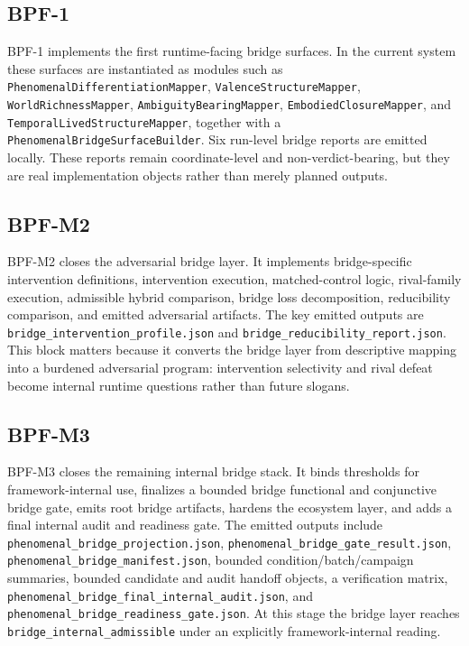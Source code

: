 \documentclass[11pt,a4paper]{article}
\theoremstyle{definition}
\begin{document}
\subsection{BPF-1}
BPF-1 implements the first runtime-facing bridge surfaces. In the current system these surfaces are instantiated as modules such as \texttt{PhenomenalDifferentiationMapper}, \texttt{ValenceStructureMapper}, \texttt{WorldRichnessMapper}, \texttt{AmbiguityBearingMapper}, \texttt{EmbodiedClosureMapper}, and \texttt{TemporalLivedStructureMapper}, together with a \texttt{PhenomenalBridgeSurfaceBuilder}. Six run-level bridge reports are emitted locally. These reports remain coordinate-level and non-verdict-bearing, but they are real implementation objects rather than merely planned outputs.

\subsection{BPF-M2}
BPF-M2 closes the adversarial bridge layer. It implements bridge-specific intervention definitions, intervention execution, matched-control logic, rival-family execution, admissible hybrid comparison, bridge loss decomposition, reducibility comparison, and emitted adversarial artifacts. The key emitted outputs are \texttt{bridge\_intervention\_profile.json} and \texttt{bridge\_reducibility\_report.json}. This block matters because it converts the bridge layer from descriptive mapping into a burdened adversarial program: intervention selectivity and rival defeat become internal runtime questions rather than future slogans.

\subsection{BPF-M3}
BPF-M3 closes the remaining internal bridge stack. It binds thresholds for framework-internal use, finalizes a bounded bridge functional and conjunctive bridge gate, emits root bridge artifacts, hardens the ecosystem layer, and adds a final internal audit and readiness gate. The emitted outputs include \texttt{phenomenal\_bridge\_projection.json}, \texttt{phenomenal\_bridge\_gate\_result.json}, \texttt{phenomenal\_bridge\_manifest.json}, bounded condition/batch/campaign summaries, bounded candidate and audit handoff objects, a verification matrix, \texttt{phenomenal\_bridge\_final\_internal\_audit.json}, and \texttt{phenomenal\_bridge\_readiness\_gate.json}. At this stage the bridge layer reaches \texttt{bridge\_internal\_admissible} under an explicitly framework-internal reading.
\end{document}
